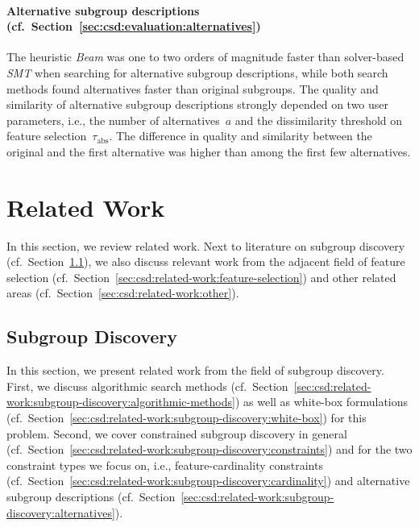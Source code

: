 \documentclass{article}
\theoremstyle{definition}
\begin{document}
\paragraph{Alternative subgroup descriptions (cf.~Section~\ref{sec:csd:evaluation:alternatives})}

The heuristic \emph{Beam} was one to two orders of magnitude faster than solver-based \emph{SMT} when searching for alternative subgroup descriptions, while both search methods found alternatives faster than original subgroups.
The quality and similarity of alternative subgroup descriptions strongly depended on two user parameters, i.e., the number of alternatives~$a$ and the dissimilarity threshold on feature selection~$\tau_{\text{abs}}$.
The difference in quality and similarity between the original and the first alternative was higher than among the first few alternatives.

\section{Related Work}
\label{sec:csd:related-work}

In this section, we review related work.
Next to literature on subgroup discovery (cf.~Section~\ref{sec:csd:related-work:subgroup-discovery}), we also discuss relevant work from the adjacent field of feature selection (cf.~Section~\ref{sec:csd:related-work:feature-selection}) and other related areas (cf.~Section~\ref{sec:csd:related-work:other}).

\subsection{Subgroup Discovery}
\label{sec:csd:related-work:subgroup-discovery}

In this section, we present related work from the field of subgroup discovery.
First, we discuss algorithmic search methods (cf.~Section~\ref{sec:csd:related-work:subgroup-discovery:algorithmic-methods}) as well as white-box formulations (cf.~Section~\ref{sec:csd:related-work:subgroup-discovery:white-box}) for this problem.
Second, we cover constrained subgroup discovery in general (cf.~Section~\ref{sec:csd:related-work:subgroup-discovery:constraints}) and for the two constraint types we focus on, i.e., feature-cardinality constraints (cf.~Section~\ref{sec:csd:related-work:subgroup-discovery:cardinality}) and alternative subgroup descriptions (cf.~Section~\ref{sec:csd:related-work:subgroup-discovery:alternatives}).
\end{document}
